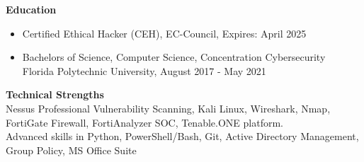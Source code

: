 \documentclass[12pt,a4paper]{article}
\begin{document}
    
    


\textbf{Education}
\begin{itemize}
    \item Certified Ethical Hacker (CEH), EC-Council, Expires: April 2025
    \item Bachelors of Science, Computer Science, Concentration Cybersecurity\\Florida Polytechnic University, August 2017 - May 2021
\end{itemize}


\textbf{Technical Strengths}\\
Nessus Professional Vulnerability Scanning, Kali Linux, Wireshark, Nmap, FortiGate Firewall, FortiAnalyzer SOC, Tenable.ONE platform.\\
Advanced skills in Python, PowerShell/Bash, Git, 
Active Directory Management, Group Policy, MS Office Suite\\
\end{document}
